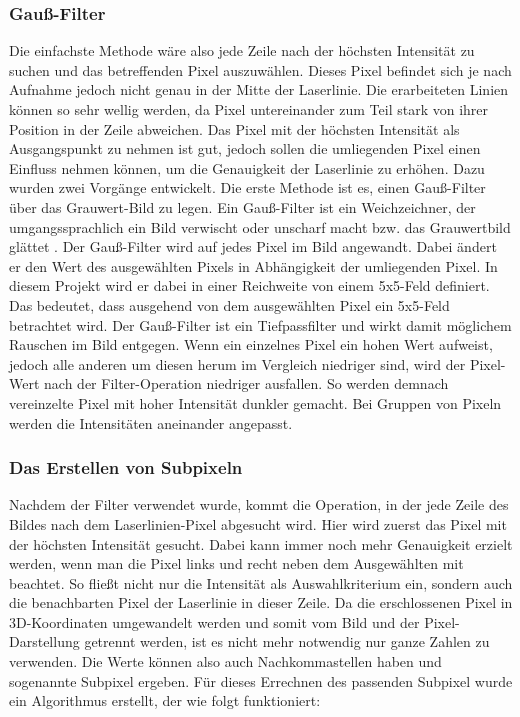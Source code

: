 	\subsubsection{Gauß-Filter}
	Die einfachste Methode wäre also jede Zeile nach der höchsten Intensität zu suchen und das betreffenden Pixel auszuwählen. Dieses Pixel befindet sich je nach Aufnahme jedoch nicht genau in der Mitte der Laserlinie. Die erarbeiteten Linien können so sehr \glqq wellig\grqq{} werden, da Pixel untereinander zum Teil stark von ihrer Position in der Zeile abweichen. Das Pixel mit der höchsten Intensität als Ausgangspunkt zu nehmen ist gut, jedoch sollen die umliegenden Pixel einen Einfluss nehmen können, um die Genauigkeit der Laserlinie zu erhöhen. Dazu wurden zwei Vorgänge entwickelt. \newline
	Die erste Methode ist es, einen Gauß-Filter über das Grauwert-Bild zu legen. Ein Gauß-Filter ist ein Weichzeichner, der umgangssprachlich ein Bild verwischt oder unscharf macht bzw. das Grauwertbild glättet \citep[vgl.][S. 134ff]{nischwitz_bildverarbeitung_2020}. Der Gauß-Filter wird auf jedes Pixel im Bild angewandt. Dabei ändert er den Wert des ausgewählten Pixels in Abhängigkeit der umliegenden Pixel. In diesem Projekt wird er dabei in einer Reichweite von einem 5x5-Feld definiert. Das bedeutet, dass ausgehend von dem ausgewählten Pixel ein 5x5-Feld betrachtet wird. Der Gauß-Filter ist ein Tiefpassfilter und wirkt damit möglichem Rauschen im Bild entgegen. Wenn ein einzelnes Pixel ein hohen Wert aufweist, jedoch alle anderen um diesen herum im Vergleich niedriger sind, wird der Pixel-Wert nach der Filter-Operation niedriger ausfallen. So werden demnach vereinzelte Pixel mit hoher Intensität dunkler gemacht. Bei Gruppen von Pixeln werden die Intensitäten aneinander angepasst.
	
	\subsubsection{Das Erstellen von Subpixeln}
	Nachdem der Filter verwendet wurde, kommt die Operation, in der jede Zeile des Bildes nach dem Laserlinien-Pixel abgesucht wird. Hier wird zuerst das Pixel mit der höchsten Intensität gesucht. Dabei kann immer noch mehr  Genauigkeit erzielt werden, wenn man die Pixel links und recht neben dem Ausgewählten mit beachtet. So fließt nicht nur die Intensität als Auswahlkriterium ein, sondern auch die benachbarten Pixel der Laserlinie in dieser Zeile. Da die erschlossenen Pixel in 3D-Koordinaten umgewandelt werden und somit vom Bild und der Pixel-Darstellung getrennt werden, ist es nicht mehr notwendig nur ganze Zahlen zu verwenden. Die Werte können also auch Nachkommastellen haben und sogenannte Subpixel ergeben. Für dieses Errechnen des passenden Subpixel wurde ein Algorithmus erstellt, der wie folgt funktioniert:
	
